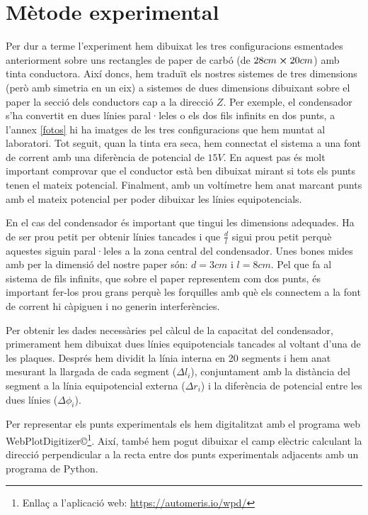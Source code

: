 \documentclass[11pt]{article}
\begin{document}
\section{Mètode experimental}\label{sec: metode}
Per dur a terme l'experiment hem dibuixat les tres configuracions esmentades anteriorment sobre uns rectangles de paper de carbó (de $28cm\cross20cm$) amb tinta conductora. Així doncs, hem traduït els nostres sistemes de tres dimensions (però amb simetria en un eix) a sistemes de dues dimensions dibuixant sobre el paper la secció dels conductors cap a la direcció $Z$. Per exemple, el condensador s'ha convertit en dues línies paral·leles o els dos fils infinits en dos punts, a l'annex \ref{fotos} hi ha imatges de les tres configuracions que hem muntat al laboratori. Tot seguit, quan la tinta era seca, hem connectat el sistema a una font de corrent amb una diferència de potencial de $15 V$. En aquest pas és molt important comprovar que el conductor està ben dibuixat mirant si tots els punts tenen el mateix potencial. Finalment, amb un voltímetre hem anat marcant punts amb el mateix potencial per poder dibuixar les línies equipotencials.

En el cas del condensador és important que tingui les dimensions adequades. Ha de ser prou petit per obtenir línies tancades i que $\frac{d}{l}$ sigui prou petit perquè aquestes siguin paral·leles a la zona central del condensador. Unes bones mides amb per la dimensió del nostre paper són: $d=3cm$ i $l=8cm$.
Pel que fa al sistema de fils infinits, que sobre el paper representem com dos punts, és important fer-los prou grans perquè les forquilles amb què els connectem a la font de corrent hi càpiguen i no generin interferències.

Per obtenir les dades necessàries pel càlcul de la capacitat del condensador, primerament hem dibuixat dues línies equipotencials tancades al voltant d'una de les plaques. Després hem dividit la línia interna en 20 segments i hem anat mesurant la llargada de cada segment ($\Delta l_i$), conjuntament amb la distància del segment a la línia equipotencial externa ($\Delta r_i$) i la diferència de potencial entre les dues línies ($\Delta \phi_i$).

Per representar els punts experimentals els hem digitalitzat amb el programa web WebPlotDigitizer\copyright\footnote{Enllaç a l'aplicació web: \url{https://automeris.io/wpd/}}. Així, també hem pogut dibuixar el camp elèctric calculant la direcció perpendicular a la recta entre dos punts experimentals adjacents amb un programa de Python.
\end{document}
